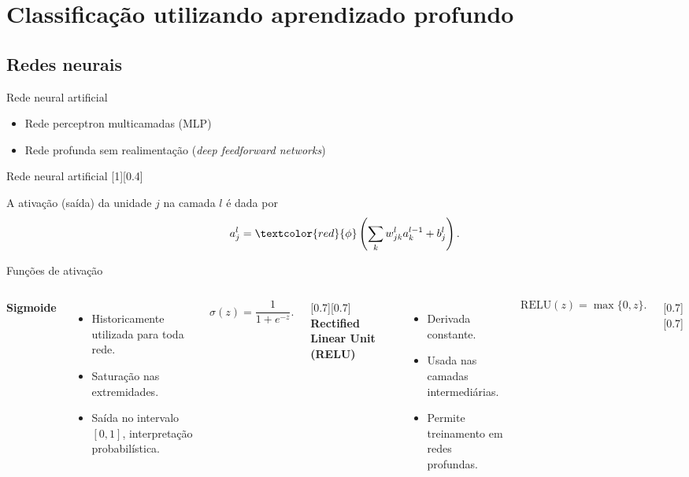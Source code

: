 \section{Classificação utilizando aprendizado profundo}

\subsection{Redes neurais}

\begin{frame}{Rede neural artificial}
	\begin{itemize}
		\item Rede perceptron multicamadas (MLP)
		\item Rede profunda sem realimentação (\textit{deep feedforward networks})
	\end{itemize}

\end{frame}

\begin{frame}{Rede neural artificial}
	[0.4]

	A ativação (saída) da unidade $j$ na camada $l$ é dada por
	\begin{equation}
	a^l_j = \textcolor{red}{\phi} \left( \sum_k w_{jk}^l a_k^{l-1} + b_j^l \right).
	\end{equation}
\end{frame}

\begin{frame}{Funções de ativação}
	\begin{columns}[T]
		\textbf{Sigmoide}		
		\begin{itemize}
			\item Historicamente utilizada para toda rede.
			\item Saturação nas extremidades.
			\item Saída no intervalo $[0,1]$, interpretação probabilística.
		\end{itemize}

		\begin{equation}
		\sigma(z) = \frac{1}{1+e^{-z}}.
		\end{equation}

		[0.7][0.7]
		\textbf{Rectified Linear Unit (RELU)}
		\begin{itemize}
			\item Derivada constante.
			\item Usada nas camadas intermediárias.
			\item Permite treinamento em redes profundas.
		\end{itemize}

		\begin{equation}
			\text{RELU}(z) = \max\{0,z\}.
		\end{equation}

		[0.7][0.7]
	\end{columns}
\end{frame}

